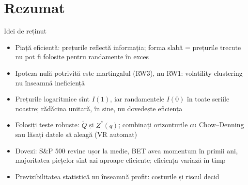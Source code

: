 \section{Rezumat}

\begin{frame}{Idei de reținut}
\itemsize{\small}
\begin{itemize}
    \item Piață eficientă: prețurile reflectă informația; forma slabă = prețurile trecute nu pot fi folosite pentru randamente în exces
    \item Ipoteza nulă potrivită este martingalul (RW3), nu RW1: volatility clustering nu înseamnă ineficiență
    \item Prețurile logaritmice sînt $I(1)$, iar randamentele $I(0)$ în toate seriile noastre; rădăcina unitară, în sine, nu dovedește eficiența
    \item Folosiți teste robuste: $\tilde Q$ și $Z^*(q)$; combinați orizonturile cu Chow--Denning sau lăsați datele să aleagă (VR automat)
    \item Dovezi: S\&P 500 revine ușor la medie, BET avea momentum în primii ani, majoritatea piețelor sînt azi aproape eficiente; eficiența variază în timp
    \item Previzibilitatea statistică nu înseamnă profit: costurile și riscul decid
\end{itemize}
\end{frame}

